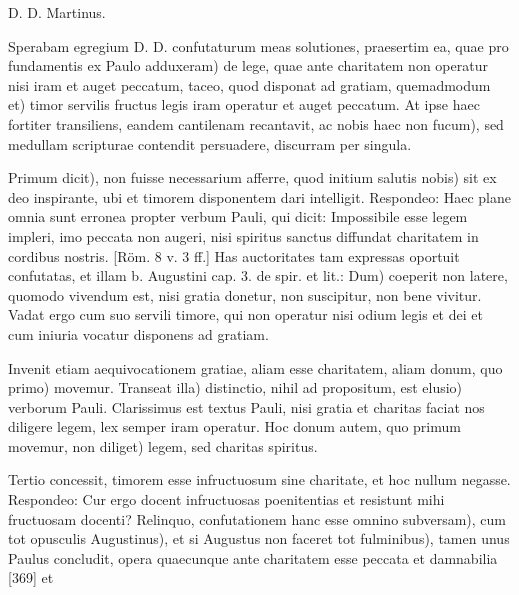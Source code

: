 D. D. Martinus.

Sperabam egregium D. D. confutaturum meas solutiones, praesertim ea, quae pro fundamentis ex Paulo adduxeram) de lege, quae ante charitatem non operatur nisi iram et auget peccatum, taceo, quod disponat ad gratiam, quemadmodum et) timor servilis fructus legis iram operatur et auget peccatum. At ipse haec fortiter transiliens, eandem cantilenam recantavit, ac nobis haec non fucum), sed medullam scripturae contendit persuadere, discurram per singula.

Primum dicit), non fuisse necessarium afferre, quod initium salutis nobis) sit ex deo inspirante, ubi et timorem disponentem dari intelligit. Respondeo: Haec plane omnia sunt erronea propter verbum Pauli, qui dicit: Impossibile esse legem impleri, imo peccata non augeri, nisi spiritus sanctus diffundat charitatem in cordibus nostris. [Röm. 8 v. 3 ff.] Has auctoritates tam expressas oportuit confutatas, et illam b. Augustini cap. 3. de spir. et lit.: Dum) coeperit non latere, quomodo vivendum est, nisi gratia donetur, non suscipitur, non bene vivitur. Vadat ergo cum suo servili timore, qui non operatur nisi odium legis et dei et cum iniuria vocatur disponens ad gratiam.

Invenit etiam aequivocationem gratiae, aliam esse charitatem, aliam donum, quo primo) movemur. Transeat illa) distinctio, nihil ad propositum, est elusio) verborum Pauli. Clarissimus est textus Pauli, nisi gratia et charitas faciat nos diligere legem, lex semper iram operatur. Hoc donum autem, quo primum movemur, non diliget) legem, sed charitas spiritus.

Tertio concessit, timorem esse infructuosum sine charitate, et hoc nullum negasse. Respondeo: Cur ergo docent infructuosas poenitentias et resistunt mihi fructuosam docenti? Relinquo, confutationem hanc esse omnino subversam), cum tot opusculis Augustinus), et si Augustus non faceret tot fulminibus), tamen unus Paulus concludit, opera quaecunque ante charitatem esse peccata et damnabilia [369] et

